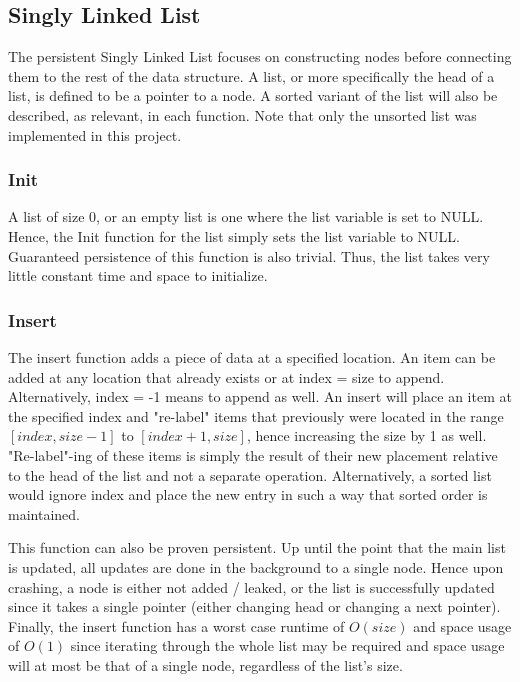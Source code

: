 \documentclass[twocolumn]{article}
\begin{document}
\subsection{Singly Linked List}

The persistent Singly Linked List focuses on constructing nodes before
connecting them to the rest of the data structure. A list, or more specifically
the head of a list, is defined to be a pointer to a node. A sorted variant of
the list will also be described, as relevant, in each function. Note that only
the unsorted list was implemented in this project.

\subsubsection{Init}

A list of size 0, or an empty list is one where the list variable is set to
NULL. Hence, the Init function for the list simply sets the list variable to
NULL. Guaranteed persistence of this function is also trivial. Thus, the list
takes very little constant time and space to initialize.

\subsubsection{Insert}

The insert function adds a piece of data at a specified location. An item can be
added at any location that already exists or at index = size to append.
Alternatively, index = -1 means to append as well. An insert will place an item
at the specified index and "re-label" items that previously were located in the
range $[index,size-1]$ to $[index+1,size]$, hence increasing the size by 1 as
well. "Re-label"-ing of these items is simply the result of their new placement
relative to the head of the list and not a separate operation. Alternatively,
a sorted list would ignore index and place the new entry in such a way that
sorted order is maintained.

This function can also be proven persistent. Up until the point that the main
list is updated, all updates are done in the background to a single node. Hence
upon crashing, a node is either not added / leaked, or the list is successfully
updated since it takes a single pointer (either changing head or changing a next
pointer). Finally, the insert function has a worst case runtime of $O(size)$ and
space usage of $O(1)$ since iterating through the whole list may be required and
space usage will at most be that of a single node, regardless of the list's
size.
\end{document}
